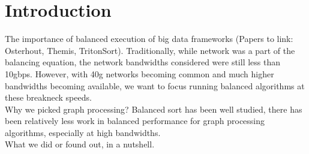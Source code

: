 \section{Introduction}
\label{sec:intro}
The importance of balanced execution of big data frameworks (Papers to link: 
Osterhout\cite{Ousterhout:2015:MSP:2789770.2789791}, Themis\cite{Rasmussen:2012:TIM:2391229.2391242}, 
TritonSort\cite{Rasmussen:2013:TBE:2427631.2427634}). Traditionally, while network was a part of the 
balancing equation, the network bandwidths considered were still less than 10gbps. However, with 40g
networks becoming common and much higher bandwidths becoming available, we want to focus running 
balanced algorithms at these breakneck speeds. \\

Why we picked graph processing? Balanced sort has been well studied, there has been relatively less 
work in balanced performance for graph processing algorithms, especially at high bandwidths. \\

What we did or found out, in a nutshell.

